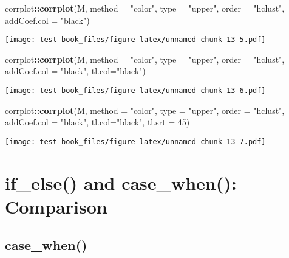 \documentclass[]{book}
\newenvironment{Shaded}{\begin{snugshade}}{\end{snugshade}}
\newcommand{\DataTypeTok}[1]{\textcolor[rgb]{0.13,0.29,0.53}{#1}}
\newcommand{\DecValTok}[1]{\textcolor[rgb]{0.00,0.00,0.81}{#1}}
\newcommand{\KeywordTok}[1]{\textcolor[rgb]{0.13,0.29,0.53}{\textbf{#1}}}
\newcommand{\NormalTok}[1]{#1}
\newcommand{\OperatorTok}[1]{\textcolor[rgb]{0.81,0.36,0.00}{\textbf{#1}}}
\newcommand{\StringTok}[1]{\textcolor[rgb]{0.31,0.60,0.02}{#1}}
\begin{document}
\begin{Shaded}
\begin{Highlighting}[]
\NormalTok{corrplot}\OperatorTok{::}\KeywordTok{corrplot}\NormalTok{(M, }\DataTypeTok{method =} \StringTok{"color"}\NormalTok{, }\DataTypeTok{type =} \StringTok{"upper"}\NormalTok{, }\DataTypeTok{order =} \StringTok{"hclust"}\NormalTok{, }\DataTypeTok{addCoef.col =} \StringTok{"black"}\NormalTok{)}
\end{Highlighting}
\end{Shaded}

\texttt{[image: test-book\_files/figure-latex/unnamed-chunk-13-5.pdf]}

\begin{Shaded}
\begin{Highlighting}[]
\NormalTok{corrplot}\OperatorTok{::}\KeywordTok{corrplot}\NormalTok{(M, }\DataTypeTok{method =} \StringTok{"color"}\NormalTok{, }\DataTypeTok{type =} \StringTok{"upper"}\NormalTok{, }\DataTypeTok{order =} \StringTok{"hclust"}\NormalTok{, }\DataTypeTok{addCoef.col =} \StringTok{"black"}\NormalTok{, }\DataTypeTok{tl.col=}\StringTok{"black"}\NormalTok{)}
\end{Highlighting}
\end{Shaded}

\texttt{[image: test-book\_files/figure-latex/unnamed-chunk-13-6.pdf]}

\begin{Shaded}
\begin{Highlighting}[]
\NormalTok{corrplot}\OperatorTok{::}\KeywordTok{corrplot}\NormalTok{(M, }\DataTypeTok{method =} \StringTok{"color"}\NormalTok{, }\DataTypeTok{type =} \StringTok{"upper"}\NormalTok{, }\DataTypeTok{order =} \StringTok{"hclust"}\NormalTok{, }\DataTypeTok{addCoef.col =} \StringTok{"black"}\NormalTok{, }\DataTypeTok{tl.col=}\StringTok{"black"}\NormalTok{, }\DataTypeTok{tl.srt =} \DecValTok{45}\NormalTok{)}
\end{Highlighting}
\end{Shaded}

\texttt{[image: test-book\_files/figure-latex/unnamed-chunk-13-7.pdf]}

\hypertarget{if_else-and-case_when-comparison}{%
\chapter{if\_else() and case\_when(): Comparison}\label{if_else-and-case_when-comparison}}

\hypertarget{case_when}{%
\section{case\_when()}\label{case_when}}
\end{document}
